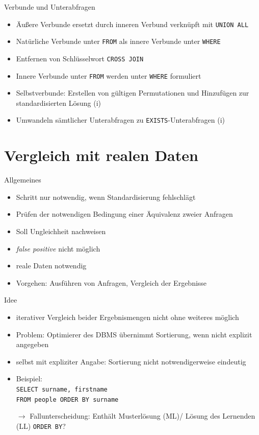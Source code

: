 \documentclass{beamer}
\begin{document}
\begin{frame}[fragile]{Verbunde und Unterabfragen}
\begin{itemize}
\item Äußere Verbunde ersetzt durch inneren Verbund verknüpft mit \verb|UNION ALL|
\item Natürliche Verbunde unter \verb|FROM| als innere Verbunde unter \verb|WHERE|
\item Entfernen von Schlüsselwort \verb|CROSS JOIN|
\item Innere Verbunde unter \verb|FROM| werden unter \verb|WHERE| formuliert
\item Selbstverbunde: Erstellen von gültigen Permutationen und Hinzufügen zur standardisierten Lösung (i)
\item Umwandeln sämtlicher Unterabfragen zu \verb|EXISTS|-Unterabfragen (i)
\end{itemize}
\end{frame}

\section{Vergleich mit realen Daten}

\begin{frame}[fragile]{Allgemeines}
\begin{itemize}
\item Schritt nur notwendig, wenn Standardisierung fehlschlägt
\item Prüfen der notwendigen Bedingung einer Äquivalenz zweier Anfragen
\item Soll Ungleichheit nachweisen
\item \textit{false positive} nicht möglich
\item reale Daten notwendig
\item Vorgehen: Ausführen von Anfragen, Vergleich der Ergebnisse 
\end{itemize}
\end{frame}


\begin{frame}[fragile]{Idee}
\begin{itemize}
\item iterativer Vergleich beider Ergebnismengen nicht ohne weiteres möglich
\item Problem: Optimierer des DBMS übernimmt Sortierung, wenn nicht explizit angegeben
\item selbst mit expliziter Angabe: Sortierung nicht notwendigerweise eindeutig
\item Beispiel: \\\verb|SELECT surname, firstname|\\\verb|FROM people ORDER BY surname|
\item[$\to$] Fallunterscheidung: Enthält Musterlösung (ML)/ Lösung des Lernenden (LL) \verb|ORDER BY|?
\end{itemize}
\end{frame}
\end{document}
